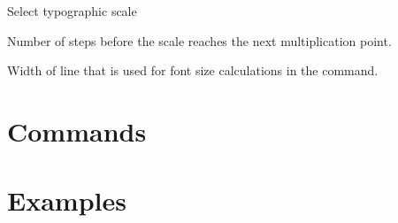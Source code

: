 \documentclass{ltxdoc}
\begin{document}
\noindent {} Select typographic scale

\noindent {} Number of steps before the scale reaches the next multiplication point.

\noindent {} 

\noindent {} 

\noindent {} Width of line that is used for font size calculations in the \cmd{\setsizes} command.




\section{Commands}

\DescribeMacro\setsizes
\cmd\setsizes{}


\section{Examples}
\end{document}
